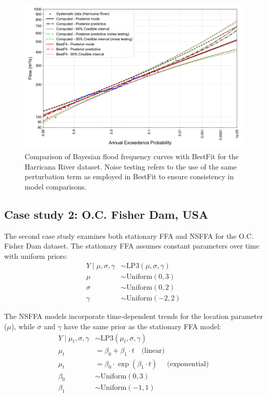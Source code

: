 \begin{figure}[ht!]
    \centering
    \includegraphics[width=1\linewidth]{_plots/HRA_bayesian_flood_quantiles_lp3.png}
    \caption{Comparison of Bayesian flood frequency curves with BestFit for the Harricana River dataset. Noise testing refers to the use of the same perturbation term as employed in BestFit to ensure consistency in model comparisons.}
    \label{fig:HRA_bayesian_flood_quantiles_lp3}
\end{figure}

\subsection{Case study 2: O.C. Fisher Dam, USA}

The second case study examines both stationary FFA and NSFFA for the O.C. Fisher Dam dataset. The stationary FFA assumes constant parameters over time with uniform priors: 
\begin{align*}
    Y \mid \mu, \sigma, \gamma &\sim \text{LP3}(\mu, \sigma, \gamma)\\
    \mu &\sim \text{Uniform}(0,3)\\
    \sigma &\sim \text{Uniform}(0,2)\\
    \gamma &\sim \text{Uniform}(-2,2)
\end{align*}

The NSFFA models incorporate time-dependent trends for the location parameter ($\mu$), while $\sigma$ and $\gamma$ have the same prior as the stationary FFA model:
\begin{align*}
    Y \mid \mu_t, \sigma, \gamma &\sim \text{LP3}(\mu_t, \sigma, \gamma)\\
    \mu_t &=\beta_0 + \beta_1 \cdot t \quad \text{(linear)}\\
    \mu_t &=\beta_0 \cdot \exp(\beta_1 \cdot t ) \quad \text{ (exponential)}\\
    \beta_0 &\sim \text{Uniform}(0,3)\\
    \beta_1 &\sim \text{Uniform}(-1,1)
\end{align*}


